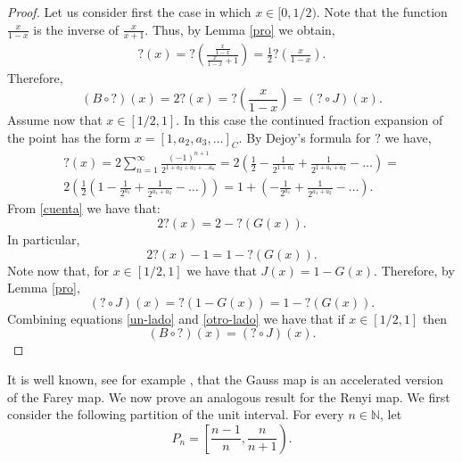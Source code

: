 \documentclass[letterpaper,10pt,reqno]{amsart}
\numberwithin{equation}{section}     %
\newcommand{\N}{\mathbb{N}}
\def\N{{\mathbb N}}
\begin{document}
\begin{proof}
Let us consider first the case in which $x \in [0, 1/2)$. Note that the function $\frac{x}{1-x}$ is the inverse of $\frac{x}{x+1}$. Thus, by Lemma \ref{pro} we obtain,
\begin{eqnarray*}
?(x)= ?\left(\frac{\frac{x}{1-x}}{\frac{x}{1-x} +1}	\right)= \frac{1}{2} ? \left(\frac{x}{1-x}	\right).
\end{eqnarray*}
Therefore,
\begin{equation*}
(B \circ ?)(x)= 2?(x)= ? \left(\frac{x}{1-x}	\right)= (? \circ J)(x).
\end{equation*}
 Assume now that $x \in [1/2, 1 ]$. In this case the continued fraction expansion of the point has the form $x=[1, a_2, a_3, \dots]_C$. By Dejoy's formula for $?$ we have,
 \begin{eqnarray} \label{cuenta}
 ?(x)= 2 \sum_{n=1}^{\infty} \frac{(-1)^{n+1}}{2^{1+a_2+a_3+ \dots a_n}}= 2\left(\frac{1}{2} - \frac{1}{2^{1+a_1}} +\frac{1}{2^{1+a_1+a_2}} - \dots		\right) =\\
  2\left(\frac{1}{2} \left( 1 - \frac{1}{2^{a_1}} +\frac{1}{2^{a_1+a_2}} - \dots	\right)	\right) =
  1 + \left(	 - \frac{1}{2^{a_1}} +\frac{1}{2^{a_1+a_2}} - \dots		\right).
 \end{eqnarray}
From \eqref{cuenta} we  have that:
\begin{equation*}
2?(x)= 2 - ?(G(x)).
\end{equation*}
In particular,
\begin{equation} \label{un-lado}
2?(x)-1= 1 -?(G(x)).
\end{equation}
Note now that, for $x \in [1/2, 1]$ we have that $J(x)= 1- G(x)$. Therefore, by Lemma \ref{pro},
\begin{equation} \label{otro-lado}
(? \circ J)(x)=?(1-G(x))= 1- ?(G(x)).
\end{equation}
Combining equations \eqref{un-lado} and \eqref{otro-lado} we have that if $x \in [1/2, 1]$ then
\begin{equation*}
(B \circ ?)(x)=(? \circ J)(x).
\end{equation*}
\end{proof}


It is well known, see for example \cite[Section 2.1]{i2}, that the Gauss map is an accelerated version of the Farey map. We now  prove an analogous result for the Renyi map.  We first consider the following partition of the unit interval. For every $n \in \N$, let
\begin{equation*}
P_n= \left[	\frac{n-1}{n}, \frac{n}{n+1}	\right).
\end{equation*}
\end{document}
